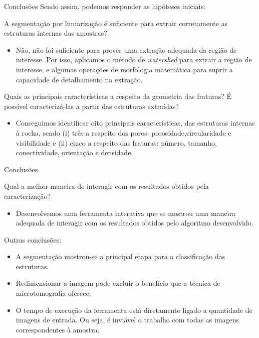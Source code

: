 \documentclass{beamer}
\begin{document}
\begin{frame}{Conclusões}
Sendo assim, podemos responder as hipóteses iniciais:
    \item A segmentação por limiarização é suficiente para extrair corretamente as estruturas internas das amostras?
    \begin{itemize}
        \item Não, não foi suficiente para prover uma extração adequada da região de interesse. Por isso, aplicamos o método de \textit{watershed} para extrair a região de interesse, e algumas operações de morfologia matemática para suprir a capacidade de detalhamento na extração.
    \end{itemize}
    
    \item Quais as principais características a respeito da geometria das fraturas? É possível caracterizá-las a partir das estruturas extraídas?
    \begin{itemize}
        \item Conseguimos identificar oito principais características, das estruturas internas à rocha, sendo (i) três a respeito dos poros: porosidade,circularidade e visibilidade e (ii) cinco a respeito das fraturas: número, tamanho, conectividade, orientação e densidade.
    \end{itemize}
\end{frame}

\begin{frame}{Conclusões}
     \item Qual a melhor maneira de interagir com os resultados obtidos pela caracterização?
    \begin{itemize}
        \item Desenvolvemos uma ferramenta interativa que se mostrou uma maneira adequada de interagir com os resultados obtidos pelo algoritmo desenvolvido.
    \end{itemize}
    
    \item Outras conclusões:
    \begin{itemize}
        \item A segmentação mostrou-se a principal etapa para a classificação das estruturas.
        \item Redimensionar a imagem pode excluir o benefício que a técnica de microtomografia oferece.
        \item O tempo de execução da ferramenta está diretamente ligado a quantidade de imagens de entrada. Ou seja, é inviável o trabalho com todas as imagens correspondentes à amostra.
    \end{itemize}
\end{frame}
\end{document}
